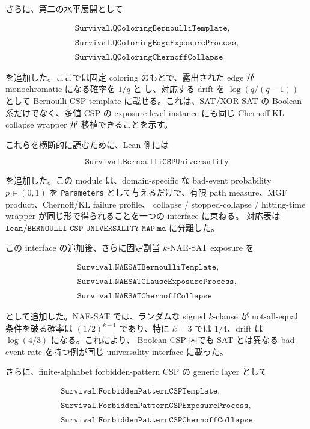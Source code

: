 \documentclass[12pt,a4paper]{article}
\begin{document}
さらに、第二の水平展開として

\[
\begin{aligned}
\texttt{Survival.QColoringBernoulliTemplate}, \\
\qquad \\
\texttt{Survival.QColoringEdgeExposureProcess}, \\
\qquad \\
\texttt{Survival.QColoringChernoffCollapse}
\end{aligned}
\]

を追加した。ここでは固定 coloring のもとで、露出された edge が monochromatic になる確率を \(1/q\) と し、対応する drift を \(\log(q/(q-1))\) として Bernoulli-CSP template に載せる。これは、SAT/XOR-SAT の Boolean 系だけでなく、多値 CSP の exposure-level instance にも同じ Chernoff-KL collapse wrapper が 移植できることを示す。

これらを横断的に読むために、Lean 側には

\[
\texttt{Survival.BernoulliCSPUniversality}
\]

を追加した。この module は、domain-specific な bad-event probability \(p\in(0,1)\) を \texttt{Parameters} として与えるだけで、有限 path measure、MGF product、Chernoff/KL failure profile、 collapse / stopped-collapse / hitting-time wrapper が同じ形で得られることを一つの interface に束ねる。 対応表は \(\texttt{lean/BERNOULLI\_CSP\_UNIVERSALITY\_MAP.md}\) に分離した。

この interface の追加後、さらに固定割当 \(k\)-NAE-SAT exposure を

\[
\begin{aligned}
\texttt{Survival.NAESATBernoulliTemplate}, \\
\qquad \\
\texttt{Survival.NAESATClauseExposureProcess}, \\
\qquad \\
\texttt{Survival.NAESATChernoffCollapse}
\end{aligned}
\]

として追加した。NAE-SAT では、ランダムな signed \(k\)-clause が not-all-equal 条件を破る確率は \((1/2)^{k-1}\) であり、特に \(k=3\) では \(1/4\)、drift は \(\log(4/3)\) になる。これにより、 Boolean CSP 内でも SAT とは異なる bad-event rate を持つ例が同じ universality interface に載った。

さらに、finite-alphabet forbidden-pattern CSP の generic layer として

\[
\begin{aligned}
\texttt{Survival.ForbiddenPatternCSPTemplate}, \\
\qquad \\
\texttt{Survival.ForbiddenPatternCSPExposureProcess}, \\
\qquad \\
\texttt{Survival.ForbiddenPatternCSPChernoffCollapse}
\end{aligned}
\]
\end{document}
